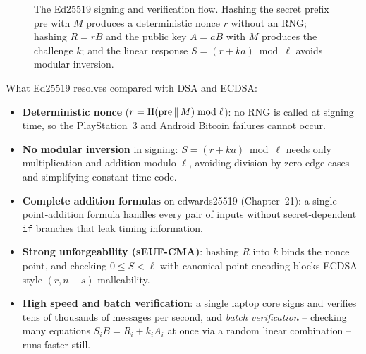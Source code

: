 \begin{figure}[htbp]
\caption{The Ed25519 signing and verification flow. Hashing the secret prefix $\mathrm{pre}$ with $M$ produces a deterministic nonce $r$ without an RNG; hashing $R = rB$ and the public key $A = aB$ with $M$ produces the challenge $k$; and the linear response $S = (r + ka) \bmod \ell$ avoids modular inversion.}
\label{ch22:fig-ed25519-flow}
\end{figure}

\begin{focusbox}
What Ed25519 resolves compared with DSA and ECDSA:
\begin{itemize}
  \item \textbf{Deterministic nonce} ($r = \operatorname{H}(\mathrm{pre}\,\|\, M) \bmod \ell$): no RNG is called at signing time, so the PlayStation~3 and Android Bitcoin failures cannot occur.
  \item \textbf{No modular inversion} in signing: $S = (r + ka) \bmod \ell$ needs only multiplication and addition modulo $\ell$, avoiding division-by-zero edge cases and simplifying constant-time code.
  \item \textbf{Complete addition formulas} on edwards25519 (Chapter~21): a single point-addition formula handles every pair of inputs without secret-dependent \texttt{if} branches that leak timing information.
  \item \textbf{Strong unforgeability (sEUF-CMA)}: hashing $R$ into $k$ binds the nonce point, and checking $0 \le S < \ell$ with canonical point encoding blocks ECDSA-style $(r, n-s)$ malleability.
  \item \textbf{High speed and batch verification}: a single laptop core signs and verifies tens of thousands of messages per second, and \emph{batch verification} -- checking many equations $S_i B = R_i + k_i A_i$ at once via a random linear combination -- runs faster still.
\end{itemize}
\end{focusbox}

